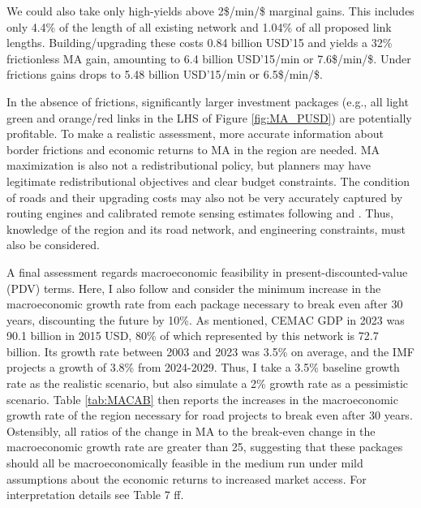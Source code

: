 \documentclass[a4paper]{article}
\begin{document}
We could also take only high-yields above 2\$/min/\$ marginal gains. This includes only 4.4\% of the length of all existing network and 1.04\% of all proposed link lengths. Building/upgrading these costs 0.84 billion USD'15 and yields a 32\% frictionless MA gain, amounting to 6.4 billion USD'15/min or 7.6\$/min/\$. Under frictions gains drops to 5.48 billion USD'15/min or 6.5\$/min/\$. \newline 

In the absence of frictions, significantly larger investment packages (e.g., all light green and orange/red links in the LHS of Figure \ref{fig:MA_PUSD}) are potentially profitable. To make a realistic assessment, more accurate information about border frictions and economic returns to MA in the region are needed. MA maximization is also not a redistributional policy, but planners may have legitimate redistributional objectives and clear budget constraints. The condition of roads and their upgrading costs may also not be very accurately captured by routing engines and calibrated remote sensing estimates following \citet{collier2016cost} and \citet{fajgelbaum2020optimal}. Thus, knowledge of the region and its road network, and engineering constraints, must also be considered. \newline 

A final assessment regards macroeconomic feasibility in present-discounted-value (PDV) terms. Here, I also follow \citet{krantz2024optimal} and consider the minimum increase in the macroeconomic growth rate from each package necessary to break even after 30 years, discounting the future by 10\%. As mentioned, CEMAC GDP in 2023 was 90.1 billion in 2015 USD, 80\% of which represented by this network is 72.7 billion. Its growth rate between 2003 and 2023 was 3.5\% on average, and the IMF projects a growth of 3.8\% from 2024-2029. Thus, I take a 3.5\% baseline growth rate as the realistic scenario, but also simulate a 2\% growth rate as a pessimistic scenario. Table \ref{tab:MACAB} then reports the increases in the macroeconomic growth rate of the region necessary for road projects to break even after 30 years. Ostensibly, all ratios of the change in MA to the break-even change in the macroeconomic growth rate are greater than 25, suggesting that these packages should all be macroeconomically feasible in the medium run under mild assumptions about the economic returns to increased market access. For interpretation details see \citet{krantz2024optimal} Table 7 ff. %
\end{document}
